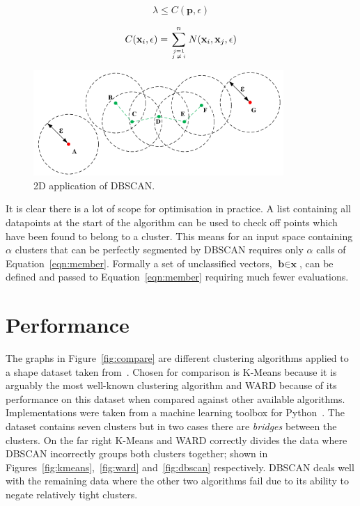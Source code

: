 \documentclass{ecsarticle}     %
\begin{document}
\begin{equation}
	\lambda \leq C(\textbf{p},\epsilon) 
	\label{eqn:inside}
\end{equation}

\begin{equation}
	C(\textbf{x}_i,\epsilon) =  \sum\limits_{j=1 \atop j\:\neq\:i}^n N(\textbf{x}_i,\textbf{x}_j,\epsilon)	
	\label{eqn:member}
\end{equation}

\begin{figure}[ht]
   \centering
    \includegraphics[height = 4cm]{circles.pdf}
   \caption{2D application of DBSCAN.}
   \label{fig:circles}
\end{figure}


It is clear there is a lot of scope for optimisation in practice.
A list containing all datapoints at the start of the algorithm can be used to check off points which have been found to belong to a cluster.
This means for an input space containing $\alpha$ clusters that can be perfectly segmented by DBSCAN requires only $\alpha$ calls of Equation~\eqref{eqn:member}.
Formally a set of unclassified vectors, $\textbf{b} \in \textbf{x}$, can be defined and passed to Equation~\eqref{eqn:member} requiring much fewer evaluations. 


\section{Performance}

The graphs in Figure~\ref{fig:compare} are different clustering algorithms applied to a shape dataset taken from~\cite{gionis05cluster}.
Chosen for comparison is K-Means because it is arguably the most well-known clustering algorithm and WARD because of its performance on this dataset when compared against other available algorithms.
Implementations were taken from a machine learning toolbox for Python~\citep{scikit13ml}.
The dataset contains seven clusters but in two cases there are \emph{bridges} between the clusters.
On the far right K-Means and WARD correctly divides the data where DBSCAN incorrectly groups both clusters together; shown in Figures~\ref{fig:kmeans},~\ref{fig:ward} and~\ref{fig:dbscan} respectively.
DBSCAN deals well with the remaining data where the other two algorithms fail due to its ability to negate relatively tight clusters.
\end{document}

